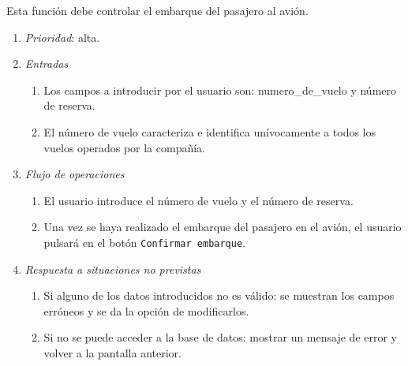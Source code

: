 	Esta función debe controlar el embarque del pasajero al avión.

	\begin{enumerate}
		\item \textit{Prioridad}: alta.
		\item \textit{Entradas}
			\begin{enumerate}
				\item Los campos a introducir por el usuario son: \gls{numero_de_vuelo} y número de reserva.
				\item El número de vuelo caracteriza e identifica unívocamente a todos los vuelos operados por la compañía.
			\end{enumerate}
		\item \textit{Flujo de operaciones}
			\begin{enumerate}
				\item El usuario introduce el número de vuelo y el número de reserva.
				\item Una vez se haya realizado el embarque del pasajero en el avión, el usuario pulsará en el botón \verb|Confirmar embarque|.
			\end{enumerate}
		\item \textit{Respuesta a situaciones no previstas}
			\begin{enumerate}
				\item Si alguno de los datos introducidos no es válido: se muestran los campos erróneos y se da la opción de modificarlos.
				\item Si no se puede acceder a la base de datos: mostrar un mensaje de error y volver a la pantalla anterior.
			\end{enumerate}
	\end{enumerate}
								
